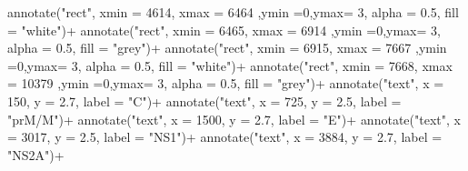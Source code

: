 \documentclass[
]{article}
\newenvironment{Shaded}{\begin{snugshade}}{\end{snugshade}}
\newcommand{\AttributeTok}[1]{\textcolor[rgb]{0.77,0.63,0.00}{#1}}
\newcommand{\DecValTok}[1]{\textcolor[rgb]{0.00,0.00,0.81}{#1}}
\newcommand{\FloatTok}[1]{\textcolor[rgb]{0.00,0.00,0.81}{#1}}
\newcommand{\FunctionTok}[1]{\textcolor[rgb]{0.00,0.00,0.00}{#1}}
\newcommand{\NormalTok}[1]{#1}
\newcommand{\SpecialCharTok}[1]{\textcolor[rgb]{0.00,0.00,0.00}{#1}}
\newcommand{\StringTok}[1]{\textcolor[rgb]{0.31,0.60,0.02}{#1}}
\begin{document}
\begin{Shaded}
\begin{Highlighting}[]
  \FunctionTok{annotate}\NormalTok{(}\StringTok{"rect"}\NormalTok{, }\AttributeTok{xmin =} \DecValTok{4614}\NormalTok{, }\AttributeTok{xmax =} \DecValTok{6464}\NormalTok{ ,}\AttributeTok{ymin =}\DecValTok{0}\NormalTok{,}\AttributeTok{ymax=} \DecValTok{3}\NormalTok{, }\AttributeTok{alpha =} \FloatTok{0.5}\NormalTok{, }\AttributeTok{fill =} \StringTok{"white"}\NormalTok{)}\SpecialCharTok{+}
  \FunctionTok{annotate}\NormalTok{(}\StringTok{"rect"}\NormalTok{, }\AttributeTok{xmin =} \DecValTok{6465}\NormalTok{, }\AttributeTok{xmax =} \DecValTok{6914}\NormalTok{ ,}\AttributeTok{ymin =}\DecValTok{0}\NormalTok{,}\AttributeTok{ymax=} \DecValTok{3}\NormalTok{, }\AttributeTok{alpha =} \FloatTok{0.5}\NormalTok{, }\AttributeTok{fill =} \StringTok{"grey"}\NormalTok{)}\SpecialCharTok{+}
  \FunctionTok{annotate}\NormalTok{(}\StringTok{"rect"}\NormalTok{, }\AttributeTok{xmin =} \DecValTok{6915}\NormalTok{, }\AttributeTok{xmax =} \DecValTok{7667}\NormalTok{ ,}\AttributeTok{ymin =}\DecValTok{0}\NormalTok{,}\AttributeTok{ymax=} \DecValTok{3}\NormalTok{, }\AttributeTok{alpha =} \FloatTok{0.5}\NormalTok{, }\AttributeTok{fill =} \StringTok{"white"}\NormalTok{)}\SpecialCharTok{+}
  \FunctionTok{annotate}\NormalTok{(}\StringTok{"rect"}\NormalTok{, }\AttributeTok{xmin =} \DecValTok{7668}\NormalTok{, }\AttributeTok{xmax =} \DecValTok{10379}\NormalTok{ ,}\AttributeTok{ymin =}\DecValTok{0}\NormalTok{,}\AttributeTok{ymax=} \DecValTok{3}\NormalTok{, }\AttributeTok{alpha =} \FloatTok{0.5}\NormalTok{, }\AttributeTok{fill =} \StringTok{"grey"}\NormalTok{)}\SpecialCharTok{+}
  \FunctionTok{annotate}\NormalTok{(}\StringTok{"text"}\NormalTok{, }\AttributeTok{x =} \DecValTok{150}\NormalTok{, }\AttributeTok{y =} \FloatTok{2.7}\NormalTok{, }\AttributeTok{label =} \StringTok{"C"}\NormalTok{)}\SpecialCharTok{+}
  \FunctionTok{annotate}\NormalTok{(}\StringTok{"text"}\NormalTok{, }\AttributeTok{x =} \DecValTok{725}\NormalTok{, }\AttributeTok{y =} \FloatTok{2.5}\NormalTok{, }\AttributeTok{label =} \StringTok{"prM/M"}\NormalTok{)}\SpecialCharTok{+}
  \FunctionTok{annotate}\NormalTok{(}\StringTok{"text"}\NormalTok{, }\AttributeTok{x =} \DecValTok{1500}\NormalTok{, }\AttributeTok{y =} \FloatTok{2.7}\NormalTok{, }\AttributeTok{label =} \StringTok{"E"}\NormalTok{)}\SpecialCharTok{+}
  \FunctionTok{annotate}\NormalTok{(}\StringTok{"text"}\NormalTok{, }\AttributeTok{x =} \DecValTok{3017}\NormalTok{, }\AttributeTok{y =} \FloatTok{2.5}\NormalTok{, }\AttributeTok{label =} \StringTok{"NS1"}\NormalTok{)}\SpecialCharTok{+}
  \FunctionTok{annotate}\NormalTok{(}\StringTok{"text"}\NormalTok{, }\AttributeTok{x =} \DecValTok{3884}\NormalTok{, }\AttributeTok{y =} \FloatTok{2.7}\NormalTok{, }\AttributeTok{label =} \StringTok{"NS2A"}\NormalTok{)}\SpecialCharTok{+}

\end{Highlighting}
\end{Shaded}
\end{document}
